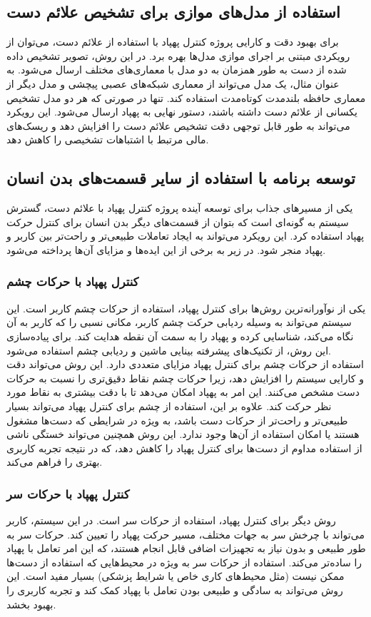 \subsection{استفاده از مدل‌های موازی برای تشخیص علائم دست}
برای بهبود دقت و کارایی پروژه کنترل پهپاد با استفاده از علائم دست، می‌توان از رویکردی مبتنی بر اجرای موازی مدل‌ها بهره برد. در این روش، تصویر تشخیص داده شده از دست به طور همزمان به دو مدل با معماری‌های مختلف ارسال 
می‌شود. به عنوان مثال، یک مدل می‌تواند از معماری شبکه‌های عصبی پیچشی و مدل دیگر از معماری حافظه بلندمدت کوتاه‌مدت استفاده کند. تنها در صورتی که هر دو مدل تشخیص یکسانی از علائم دست داشته باشند، 
دستور نهایی به پهپاد ارسال می‌شود. این رویکرد می‌تواند به طور قابل توجهی دقت تشخیص علائم دست را افزایش دهد و ریسک‌های مالی مرتبط با اشتباهات تشخیصی را کاهش دهد.

\subsection{توسعه برنامه با استفاده از سایر قسمت‌های بدن انسان}
یکی از مسیرهای جذاب برای توسعه آینده پروژه کنترل پهپاد با علائم دست، گسترش سیستم به گونه‌ای است که بتوان از قسمت‌های دیگر بدن انسان برای کنترل حرکت پهپاد استفاده کرد. این رویکرد می‌تواند به ایجاد تعاملات طبیعی‌تر و راحت‌تر بین کاربر و پهپاد منجر شود. در زیر به برخی از این ایده‌ها و مزایای آن‌ها پرداخته می‌شود.
\\
\subsubsection{کنترل پهپاد با حرکات چشم}
یکی از نوآورانه‌ترین روش‌ها برای کنترل پهپاد، استفاده از حرکات چشم کاربر است. این سیستم می‌تواند به وسیله ردیابی حرکت چشم کاربر، مکانی نسبی را که کاربر به آن نگاه می‌کند، شناسایی کرده و پهپاد را به سمت آن نقطه هدایت کند. برای پیاده‌سازی این روش، از تکنیک‌های پیشرفته بینایی ماشین و ردیابی چشم استفاده می‌شود.
\\
استفاده از حرکات چشم برای کنترل پهپاد مزایای متعددی دارد. این روش می‌تواند دقت و کارایی سیستم را افزایش دهد، زیرا حرکات چشم نقاط دقیق‌تری را نسبت به حرکات دست مشخص می‌کنند. این امر به پهپاد امکان می‌دهد تا با دقت بیشتری به نقاط مورد نظر حرکت کند. علاوه بر این، استفاده از چشم برای 
کنترل پهپاد می‌تواند بسیار طبیعی‌تر و راحت‌تر از حرکات دست باشد، به ویژه در شرایطی که دست‌ها مشغول هستند یا امکان استفاده از آن‌ها وجود ندارد. این روش همچنین می‌تواند خستگی ناشی از استفاده مداوم از دست‌ها برای کنترل پهپاد را کاهش دهد، که در نتیجه تجربه کاربری بهتری را فراهم می‌کند.

\subsubsection{کنترل پهپاد با حرکات سر}
روش دیگر برای کنترل پهپاد، استفاده از حرکات سر است. در این سیستم، کاربر می‌تواند با چرخش سر به جهات مختلف، مسیر حرکت پهپاد را تعیین کند. حرکات سر به طور طبیعی و بدون نیاز به تجهیزات اضافی قابل انجام هستند، که این امر تعامل با پهپاد را
ساده‌تر می‌کند. استفاده از حرکات سر به ویژه در محیط‌هایی که استفاده از دست‌ها ممکن نیست (مثل محیط‌های کاری خاص یا شرایط پزشکی) بسیار مفید است. این روش می‌تواند به سادگی و طبیعی بودن تعامل با پهپاد کمک کند و تجربه کاربری را بهبود بخشد.

